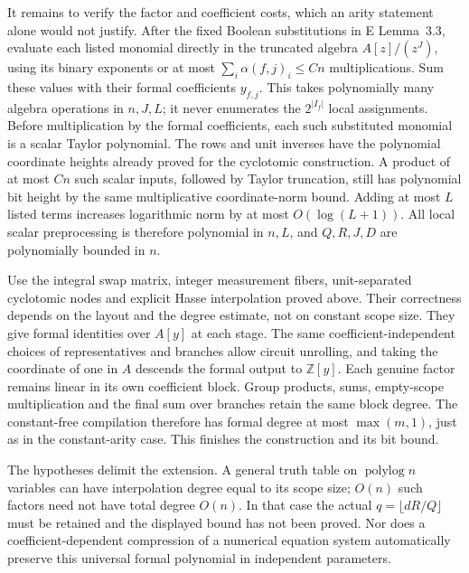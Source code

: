 It remains to verify the factor and coefficient costs,
which an arity statement alone would not justify.  After
the fixed Boolean substitutions in E Lemma~3.3, evaluate
each listed monomial directly in the truncated algebra
$A[z]/(z^J)$, using its binary exponents or at most
$\sum_i\alpha(f,j)_i\le Cn$ multiplications.  Sum these
values with their formal coefficients $y_{f,j}$.
This takes polynomially many algebra operations in
$n,J,L$; it never enumerates the $2^{|I_f|}$ local
assignments.  Before multiplication by the formal
coefficients, each such substituted monomial is a
scalar Taylor polynomial.  The rows and unit inverses
have the polynomial coordinate heights already proved
for the cyclotomic construction.  A product of at most
$Cn$ such scalar inputs, followed by Taylor truncation,
still has polynomial bit height by the same multiplicative
coordinate-norm bound.  Adding at most $L$ listed terms
increases logarithmic norm by at most $O(\log(L+1))$.
All local scalar preprocessing is therefore polynomial
in $n,L$, and $Q,R,J,D$ are polynomially bounded in $n$.

Use the integral swap matrix, integer measurement fibers,
unit-separated cyclotomic nodes and explicit Hasse
interpolation proved above.  Their correctness depends on
the layout and the degree estimate, not on constant scope
size.  They give formal identities over $A[y]$ at each
stage.  The same coefficient-independent choices of
representatives and branches allow circuit unrolling,
and taking the coordinate of one in $A$ descends the
formal output to $\mathbb Z[y]$.  Each genuine factor
remains linear in its own coefficient block.  Group
products, sums, empty-scope multiplication and the final
sum over branches retain the same block degree.  The
constant-free compilation therefore has formal degree
at most $\max(m,1)$, just as in the constant-arity case.
This finishes the construction and its bit bound.

The hypotheses delimit the extension.  A general truth
table on $\operatorname{polylog} n$ variables can have
interpolation degree equal to its scope size; $O(n)$ such
factors need not have total degree $O(n)$.  In that case
the actual $q=\lfloor dR/Q\rfloor$ must be retained and
the displayed bound has not been proved.  Nor does a
coefficient-dependent compression of a numerical equation
system automatically preserve this universal formal
polynomial in independent parameters.

